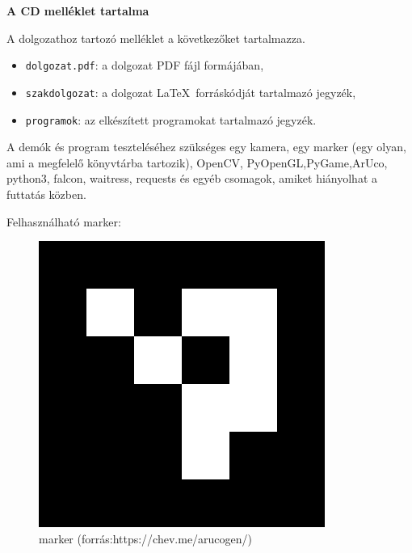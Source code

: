 \pagestyle{empty}

\noindent \textbf{\Large A CD melléklet tartalma}

\vskip 1cm

\noindent A dolgozathoz tartozó melléklet a következőket tartalmazza.

\begin{itemize}
\item \texttt{dolgozat.pdf}: a dolgozat PDF fájl formájában,
\item \texttt{szakdolgozat}: a dolgozat \LaTeX\ forráskódját tartalmazó jegyzék,
\item \texttt{programok}: az elkészített programokat tartalmazó jegyzék.
\end{itemize}


A demók és program teszteléséhez szükséges egy kamera, egy marker (egy olyan, ami a megfelelő könyvtárba tartozik),
OpenCV, PyOpenGL,PyGame,ArUco, python3, falcon, waitress, requests és egyéb csomagok, amiket hiányolhat a futtatás közben.

Felhasználható marker: 
\begin{figure}[htp]
    \centering
   	\includegraphics[scale=0.4]{images/marker.png}
	\caption{marker (forrás:https://chev.me/arucogen/)}
	\label{fig:marker}
\end{figure}



